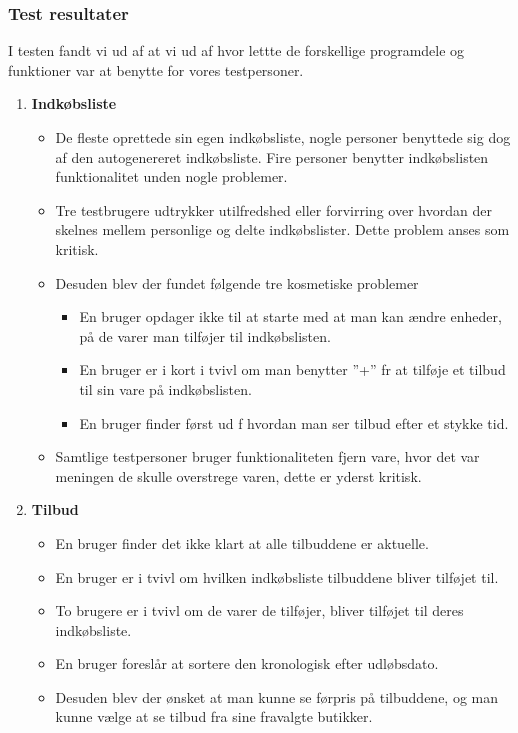 \subsubsection{Test resultater}
I testen fandt vi ud af at vi ud af hvor lettte de forskellige programdele og funktioner var at benytte for vores testpersoner.
\begin{enumerate}
   \item \textbf{Indkøbsliste}
   \begin{itemize}
      \item De fleste oprettede sin egen indkøbsliste, nogle personer benyttede sig dog af den autogenereret indkøbsliste. 
      Fire personer benytter indkøbslisten funktionalitet unden nogle problemer.
      \item Tre testbrugere udtrykker utilfredshed eller forvirring over hvordan der skelnes mellem personlige og delte indkøbslister.
      Dette problem anses som kritisk. 
      \item Desuden blev der fundet følgende tre kosmetiske problemer
      \begin{itemize}
         \item En bruger opdager ikke til at starte med at man kan ændre enheder, på de varer man tilføjer til indkøbslisten.
         \item En bruger er i kort i tvivl om man benytter ''+'' fr at tilføje et tilbud til sin vare på indkøbslisten.
         \item En bruger finder først ud f hvordan man ser tilbud efter et stykke tid.
      \end{itemize}
      \item Samtlige testpersoner bruger funktionaliteten fjern vare, hvor det var meningen de skulle overstrege varen, dette er yderst kritisk.
   \end{itemize}
   \item \textbf{Tilbud}
   \begin{itemize}
      \item En bruger finder det ikke klart at alle tilbuddene er aktuelle.
      \item En bruger er i tvivl om hvilken indkøbsliste tilbuddene bliver tilføjet til.
      \item To brugere er i tvivl om de varer de tilføjer, bliver tilføjet til deres indkøbsliste.
      \item En bruger foreslår at sortere den kronologisk efter udløbsdato.
      \item Desuden blev der ønsket at man kunne se førpris på tilbuddene, og man kunne vælge at se tilbud fra sine fravalgte butikker.

\end{itemize}
\end{enumerate}
